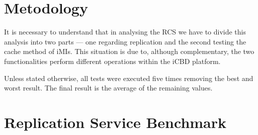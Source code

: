 \section{Metodology}
\label{sec:eval_method}

It is necessary to understand that in analysing the RCS we have to divide this analysis into two parts — one regarding replication and the second testing the cache method of iMIs. This situation is due to, although complementary, the two functionalities perform different operations within the iCBD platform.


Unless stated otherwise, all tests were executed five times removing the best and worst result. The final result is the average of the remaining values. 







\section{Replication Service Benchmark}
\label{sec:eval_rep_bench}



